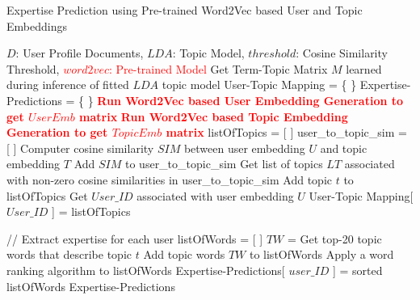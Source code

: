             \begin{algorithm}
            \caption{Expertise Prediction using Pre-trained Word2Vec based User and Topic Embeddings}
            \label{alg:word2vec_emb}
            \begin{algorithmic}[1]
               \REQUIRE $D$: User Profile Documents, $LDA$: Topic Model, $threshold$: Cosine Similarity Threshold, \textcolor{red}{$word2vec$: Pre-trained Model}
                \STATE Get Term-Topic Matrix $M$ learned during inference of fitted $LDA$ topic model
                \STATE User-Topic Mapping = \{ \}
                \STATE Expertise-Predictions = \{ \}
                \STATE \textbf{\textcolor{red}{Run Word2Vec based User Embedding Generation to get $UserEmb$ matrix}}
                \STATE \textbf{\textcolor{red}{Run Word2Vec based Topic Embedding Generation to get $TopicEmb$ matrix}}
                \STATE
                    \STATE listOfTopics = [ ]
                    \STATE user\_to\_topic\_sim = [ ]
                        \STATE Computer cosine similarity $SIM$ between user embedding $U$ and topic embedding $T$
                        \STATE Add $SIM$ to user\_to\_topic\_sim
                    \ENDFOR
                    \STATE
                    \STATE Get list of topics $LT$ associated with non-zero cosine similarities in user\_to\_topic\_sim
                            \STATE Add topic $t$ to listOfTopics
                        \ENDIF
                    \ENDFOR
                    \STATE Get $User\_ID$ associated with user embedding $U$
                    \STATE User-Topic Mapping[ $User\_ID$ ] = listOfTopics
                    
                    \STATE
                    \STATE // Extract expertise for each user
                    \STATE listOfWords = [ ]
                        \STATE $TW$ = Get top-20 topic words that describe topic $t$
                        \STATE Add topic words $TW$ to listOfWords
                    \ENDFOR
                    \STATE Apply a word ranking algorithm to listOfWords
                    \STATE Expertise-Predictions[ $user\_ID$ ] = sorted listOfWords
                \ENDFOR
                \RETURN Expertise-Predictions
            \end{algorithmic}
            \end{algorithm}
            
